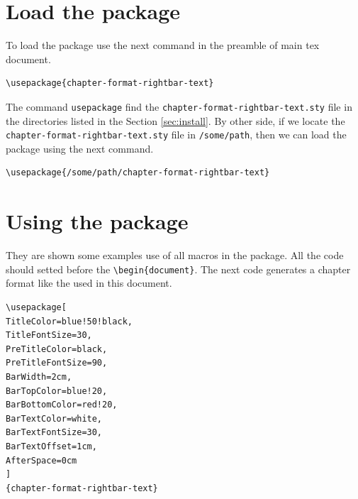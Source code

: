 \documentclass[a4paper,10pt]{book}
\begin{document}
\section{Load the package}
To load the package use the next command in the preamble of main tex document.
\begin{lstlisting}[style=mystyle]
\usepackage{chapter-format-rightbar-text}
\end{lstlisting}

The command \texttt{usepackage} find the \texttt{chapter-format-rightbar-text.sty} file 
in the directories listed in the Section \ref{sec:install}.
By other side, if we locate the \texttt{chapter-format-rightbar-text.sty} file in
\texttt{/some/path}, then we can load the package using the next command.
\begin{lstlisting}[style=mystyle]
\usepackage{/some/path/chapter-format-rightbar-text}
\end{lstlisting}



\section{Using the package}
They are shown some examples use of all macros in the package.
All the code should setted before the \verb|\begin{document}|.
The next code generates a chapter format like the used in this document.

\begin{lstlisting}[style=mystyle]
\usepackage[
TitleColor=blue!50!black,
TitleFontSize=30,
PreTitleColor=black,
PreTitleFontSize=90,
BarWidth=2cm,
BarTopColor=blue!20,
BarBottomColor=red!20,
BarTextColor=white,
BarTextFontSize=30,
BarTextOffset=1cm,
AfterSpace=0cm
]
{chapter-format-rightbar-text}
\end{lstlisting}
\end{document}
